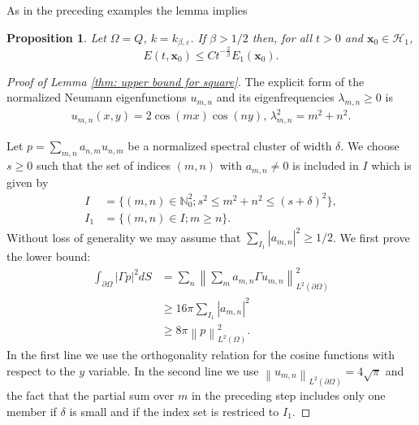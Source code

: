 \documentclass{amsart}
\newcommand{\abs}[1]{\left|#1\right|}
\newcommand{\norm}[1]{\left\| #1 \right\|}
\newcommand{\xnice}{\mathbf{x}}
\newcommand{\Ho}{\mathcal{H}}
\newcommand{\N}{\mathbb{N}}
\newtheorem{Proposition}[Theorem]{Proposition}
\begin{document}
As in the preceding examples the lemma implies
\begin{Proposition}\label{thm: square}
 Let $\Omega=Q$, $k=k_{\beta,\varepsilon}$. If $\beta>1/2$ then, for all $t>0$ and $\xnice_0\in\Ho_1$,
 \begin{equation}\nonumber
  E(t, \xnice_0) \leq C t^{-\frac{2}{\beta}} E_1(\xnice_0).
 \end{equation}
\end{Proposition}

\begin{proof}[Proof of Lemma \ref{thm: upper bound for square}]
 The explicit form of the normalized Neumann eigenfunctions $u_{m,n}$ and its eigenfrequencies $\lambda_{m,n}\geq0$ is
 \begin{align*}
  u_{m,n}(x,y) = 2\cos(mx)\cos(ny), \, \lambda_{m,n}^2 = m^2 + n^2.
 \end{align*}

 Let $p=\sum_{m,n} a_{n,m} u_{n,m}$ be a normalized spectral cluster of width $\delta$. We choose $s\geq0$ such that the set of indices $(m,n)$ with $a_{m,n}\neq 0$ is included in $I$ which is given by
 \begin{align*}
  I &= \{(m,n)\in\N_0^2; s^2\leq m^2 + n^2 \leq (s+\delta)^2\}, \\
  I_1 &= \{(m,n)\in I; m\geq n\}. 
 \end{align*}
 Without loss of generality we may assume that $\sum_{I_1}\abs{a_{m,n}}^2\geq 1/2$. We first prove the lower bound:
 \begin{align*}
  \int_{\partial\Omega} |\Gamma p|^2 dS  &= \sum_n \norm{\sum_m a_{m,n} \Gamma u_{m,n}}_{L^2(\partial\Omega)}^2 \\
  &\geq 16\pi\sum_{I_1} \abs{a_{m,n}}^2 \\
  &\geq 8\pi \norm{p}_{L^2(\Omega)}^2 .
 \end{align*}
In the first line we use the orthogonality relation for the cosine functions with respect to the $y$ variable. In the second line we use $\norm{u_{m,n}}_{L^2(\partial\Omega)}=4\sqrt{\pi}$ and the fact that the partial sum over $m$ in the preceding step includes only one member if $\delta$ is small and if the index set is restriced to $I_1$.


\end{proof}
\end{document}
